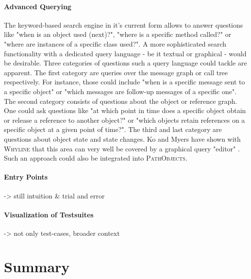 \paragraph{Advanced Querying} The keyword-based search engine in it's current form allows to answer questions like "when is an object used (next)?", "where is a specific method called?" or "where are instances of a specific class used?".
A more sophisticated search functionality with a dedicated query language - be it textual or graphical - would be desirable.
Three categories of questions such a query language could tackle are apparent.
The first category are queries over the message graph or call tree respectively.
For instance, those could include "when is a specific message sent to a specific object" or "which messages are follow-up messages of a specific one".
The second category consists of questions about the object or reference graph.
One could ask questions like "at which point in time does a specific object obtain or release a reference to another object?" or "which objects retain references on a specific object at a given point of time?".
The third and last category are questions about object state and state changes.
Ko and Myers have shown with \textsc{Whyline} that this area can very well be covered by a graphical query "editor" \cite{ko_debugging_2008}.
Such an approach could also be integrated into \textsc{PathObjects}.

\paragraph{Entry Points} -> still intuition \& trial and error

\paragraph{Visualization of Testsuites} -> not only test-cases, broader context


\section{Summary}
\label{s:ConclusionsSummary}
